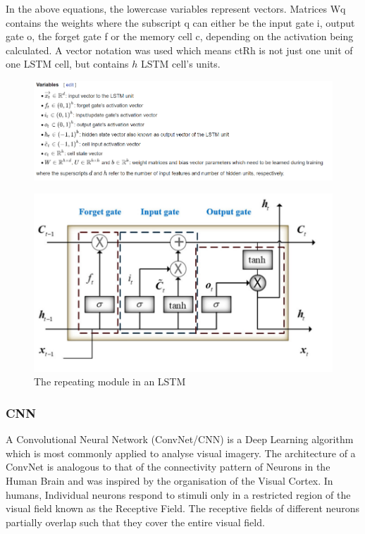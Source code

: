  In the above equations, the lowercase variables represent vectors. Matrices Wq contains the weights where the subscript q can either be the input gate i, output gate o, the forget gate f or the memory cell c, depending on the activation being calculated. A vector notation was used which means ctRh is not just one unit of one LSTM cell, but contains $h$ LSTM cell's units.
 
   \begin{figure}[h]
   	\centering
   	\includegraphics[width=1\linewidth]{images/vv.png}

   
   \end{figure}
   
   \begin{figure}[h]
   	\centering
   	\includegraphics[width=0.6\linewidth]{images/lstm.png}
   	\caption{The repeating module in an LSTM}
   	\label{l6}	
   \end{figure}
   
 
    \subsubsection{CNN}
    A Convolutional Neural Network (ConvNet/CNN) is a Deep Learning algorithm which is most commonly applied to analyse visual imagery. The architecture of a ConvNet is analogous to that of the connectivity pattern of Neurons in the Human Brain and was inspired by the organisation of the Visual Cortex. In humans, Individual neurons respond to stimuli only in a restricted region of the visual field known as the Receptive Field. The receptive fields of different neurons partially overlap such that they cover the entire visual field.
    
